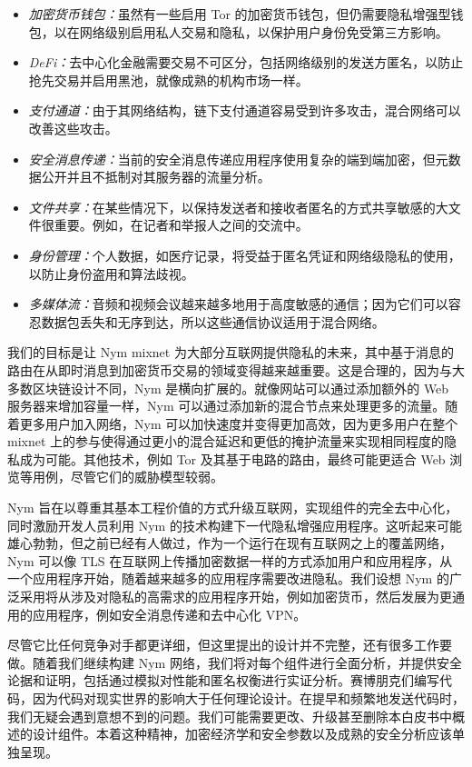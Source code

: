 \documentclass{article}
\begin{document}
\begin{itemize}
\item \emph{加密货币钱包：}虽然有一些启用 Tor 的加密货币钱包，但仍需要隐私增强型钱包，以在网络级别启用私人交易和隐私，以保护用户身份免受第三方影响。
\item \emph{DeFi：}去中心化金融需要交易不可区分，包括网络级别的发送方匿名，以防止抢先交易并启用黑池，就像成熟的机构市场一样。
\item \emph{支付通道：}由于其网络结构，链下支付通道容易受到许多攻击，混合网络可以改善这些攻击\cite{ref64}。
\item \emph{安全消息传递：}当前的安全消息传递应用程序使用复杂的端到端加密，但元数据公开并且不抵制对其服务器的流量分析。
\item \emph{文件共享：}在某些情况下，以保持发送者和接收者匿名的方式共享敏感的大文件很重要。例如，在记者和举报人之间的交流中。
\item \emph{身份管理：}个人数据，如医疗记录，将受益于匿名凭证和网络级隐私的使用，以防止身份盗用和算法歧视。
\item \emph{多媒体流：}音频和视频会议越来越多地用于高度敏感的通信；因为它们可以容忍数据包丢失和无序到达，所以这些通信协议适用于混合网络\cite{ref27}。
\end{itemize}

	我们的目标是让 Nym mixnet 为大部分互联网提供隐私的未来，其中基于消息的路由在从即时消息到加密货币交易的领域变得越来越重要。这是合理的，因为与大多数区块链设计不同，Nym 是横向扩展的。就像网站可以通过添加额外的 Web 服务器来增加容量一样，Nym 可以通过添加新的混合节点来处理更多的流量。随着更多用户加入网络，Nym 可以加快速度并变得更加高效，因为更多用户在整个 mixnet 上的参与使得通过更小的混合延迟和更低的掩护流量来实现相同程度的隐私成为可能。其他技术，例如 Tor 及其基于电路的路由，最终可能更适合 Web 浏览等用例，尽管它们的威胁模型较弱。\newline

	Nym 旨在以尊重其基本工程价值的方式升级互联网，实现组件的完全去中心化，同时激励开发人员利用 Nym 的技术构建下一代隐私增强应用程序。这听起来可能雄心勃勃，但之前已经有人做过，作为一个运行在现有互联网之上的覆盖网络，Nym 可以像 TLS 在互联网上传播加密数据一样的方式添加用户和应用程序，从一个应用程序开始，随着越来越多的应用程序需要改进隐私。我们设想 Nym 的广泛采用将从涉及对隐私的高需求的应用程序开始，例如加密货币，然后发展为更通用的应用程序，例如安全消息传递和去中心化 VPN。\newline

	尽管它比任何竞争对手都更详细，但这里提出的设计并不完整，还有很多工作要做。随着我们继续构建 Nym 网络，我们将对每个组件进行全面分析，并提供安全论据和证明，包括通过模拟对性能和匿名权衡进行实证分析。赛博朋克们编写代码，因为代码对现实世界的影响大于任何理论设计\cite{ref57}。在提早和频繁地发送代码时，我们无疑会遇到意想不到的问题。我们可能需要更改、升级甚至删除本白皮书中概述的设计组件。本着这种精神，加密经济学和安全参数以及成熟的安全分析应该单独呈现。\newline
\end{document}
